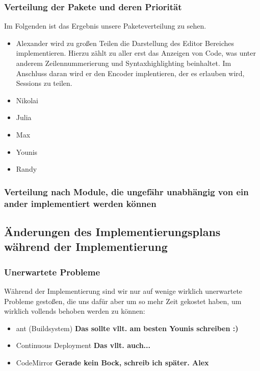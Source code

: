 \documentclass[parskip=full,11pt,twoside]{scrartcl}
\begin{document}
\subsubsection{Verteilung der Pakete und deren Priorität}
Im Folgenden ist das Ergebnis unsere Paketeverteilung zu sehen.
\begin{itemize}
    \item Alexander
        \newline
        wird zu großen Teilen die Darstellung des Editor Bereiches implementieren. 
        Hierzu zählt zu aller erst das Anzeigen von Code, was unter anderem Zeilennummerierung und Syntaxhighlighting beinhaltet.
        Im Anschluss daran wird er den Encoder implentieren, der es erlauben wird, Sessions zu teilen.
    \item Nikolai
    \item Julia
    \item Max
    \item Younis
    \item Randy
\end{itemize}


\subsubsection{Verteilung nach Module, die ungefähr unabhängig von ein ander implementiert werden können}

\subsection{Änderungen des Implementierungsplans während der Implementierung}

\subsubsection{Unerwartete Probleme}
Während der Implementierung sind wir nur auf wenige wirklich unerwartete Probleme gestoßen, die uns dafür aber um so mehr Zeit gekostet haben, um wirklich vollends behoben werden zu können:
\begin{itemize}
    \item ant (Buildsystem)
        \newline
        \textbf{Das sollte vllt. am besten Younis schreiben :)}
    \item Continuous Deployment
        \newline
        \textbf{Das vllt. auch...}
    \item CodeMirror
        \newline
        \textbf{Gerade kein Bock, schreib ich später. Alex}
\end{itemize}
\end{document}
